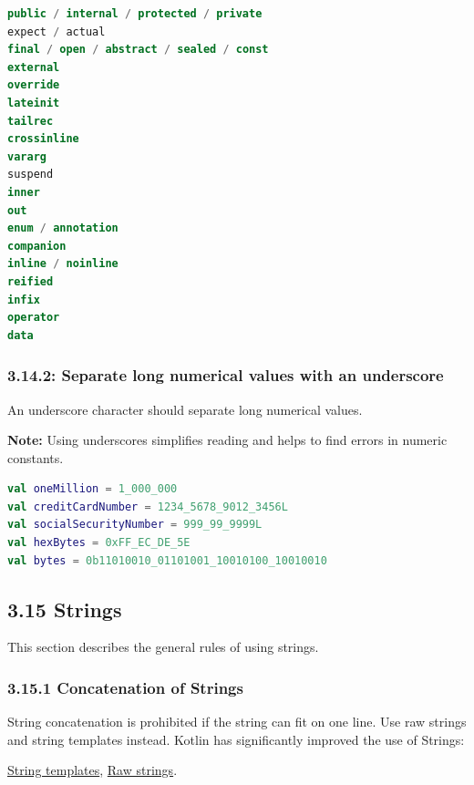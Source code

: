 {{{{\begin{lstlisting}[language=Kotlin]
public / internal / protected / private
expect / actual
final / open / abstract / sealed / const
external
override
lateinit
tailrec
crossinline
vararg
suspend
inner
out
enum / annotation
companion
inline / noinline
reified
infix
operator
data
\end{lstlisting}


\subsubsection*{\textbf{3.14.2: Separate long numerical values with an underscore}}
\leavevmode\newline

\label{sec:3.14.2}

An underscore character should separate long numerical values.

\textbf{Note:} Using underscores simplifies reading and helps to find errors in numeric constants.

\begin{lstlisting}[language=Kotlin]
val oneMillion = 1_000_000
val creditCardNumber = 1234_5678_9012_3456L
val socialSecurityNumber = 999_99_9999L
val hexBytes = 0xFF_EC_DE_5E
val bytes = 0b11010010_01101001_10010100_10010010
\end{lstlisting}


\subsection*{\textbf{3.15 Strings}}

\label{sec:3.15}

This section describes the general rules of using strings.



\subsubsection*{\textbf{3.15.1 Concatenation of Strings}}
\leavevmode\newline

\label{sec:3.15.1}

String concatenation is prohibited if the string can fit on one line. Use raw strings and string templates instead. Kotlin has significantly improved the use of Strings: 

\href{https://kotlinlang.org/docs/reference/basic-types.html#string-templates}{String templates}, \href{https://kotlinlang.org/docs/reference/basic-types.html#string-literals}{Raw strings}.

}}}}

